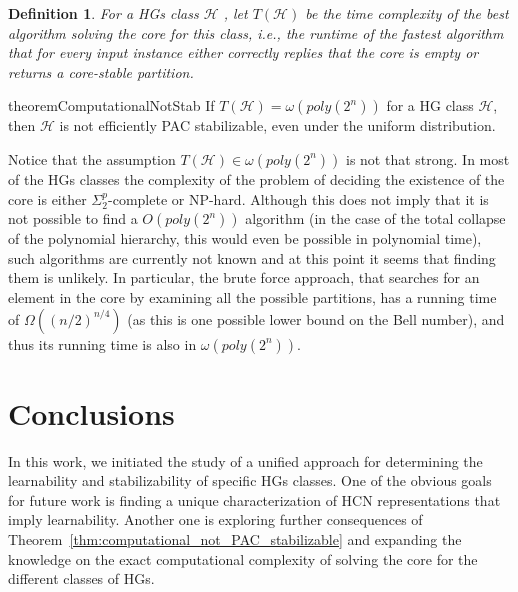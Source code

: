 \documentclass[letterpaper]{article} %
\newtheorem{definition}[theorem]{Definition}
\begin{document}
\begin{definition}For a HGs class $\mathcal{H}$ , let $T(\mathcal{H})$ be the time complexity of the best algorithm solving the core for this class, i.e., the runtime of the fastest algorithm that for every input instance either correctly replies that the core is empty or returns a core-stable partition.
\end{definition}

\begin{restatable}{theorem}{ComputationalNotStab}\label{thm:computational_not_PAC_stabilizable}
If $T(\mathcal{H}) = \omega(poly(2^n))$ for a HG class $\mathcal{H}$, then $\mathcal{H}$ is not efficiently PAC stabilizable, even under the uniform distribution.
\end{restatable}

Notice that the assumption $T(\mathcal{H})\in \omega(poly(2^n))$ is not that strong. In most of the HGs classes the complexity of the problem of deciding the existence of the core is either $\Sigma_2^p$-complete or NP-hard. Although this does not imply that it is not possible to find a $O(poly(2^n))$ algorithm (in the case of the total collapse of the polynomial hierarchy, this would even be possible in polynomial time), such algorithms are currently not known and at this point it seems that finding them is unlikely. In particular, the brute force approach, that searches for an element in the core by examining all the possible partitions, has a running time of $\Omega((n/2)^{n/4})$ (as this is one possible lower bound on the Bell number), and thus its running time is also in $\omega(poly(2^n))$.

\section{Conclusions}
In this work, we initiated the study of a unified approach for determining the learnability and stabilizability of specific HGs classes. One of the obvious goals for future work is finding a unique characterization of HCN representations that imply learnability. Another one is exploring further consequences of Theorem~\ref{thm:computational_not_PAC_stabilizable} and expanding the knowledge on the exact computational complexity of solving the core for the different classes of HGs.
\end{document}
